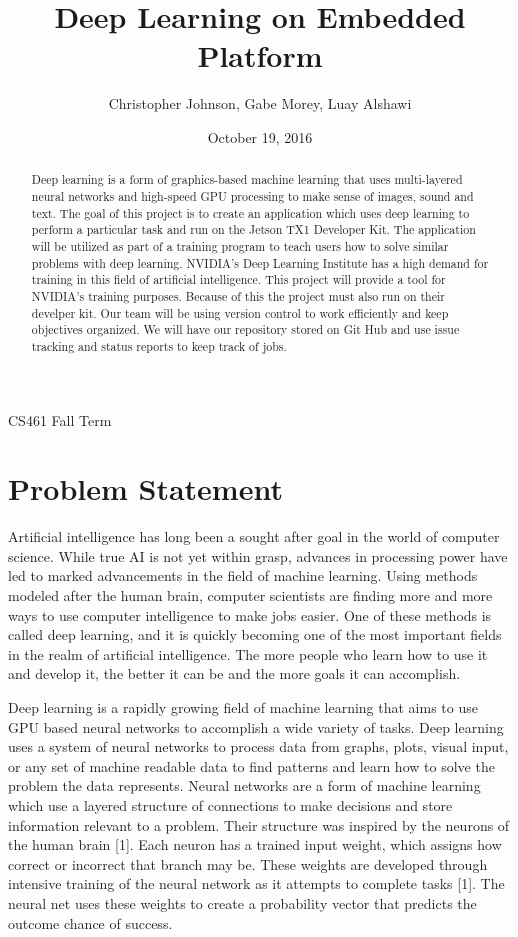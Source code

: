 \documentclass[letterpaper,10pt]{article}
\author{Christopher Johnson, Gabe Morey, Luay Alshawi}
\title{Deep Learning on Embedded Platform}
\date{October 19, 2016}
\begin{document}
\begin{titlingpage}
\maketitle
CS461 Fall Term
\begin{abstract}
Deep learning is a form of graphics-based machine learning that uses multi-layered neural networks and high-speed GPU processing to make sense of images, sound and text. The goal of this project is to create an application which uses deep learning to perform a particular task and run on the Jetson TX1 Developer Kit. The application will be utilized as part of a training program to teach users how to solve similar problems with deep learning. NVIDIA's Deep Learning Institute has a high demand for training in this field of artificial intelligence. This project will provide a tool for NVIDIA's training purposes. Because of this the project must also run on their develper kit. Our team will be using version control to work efficiently and keep objectives organized. We will have our repository stored on Git Hub and use issue tracking and status reports to keep track of jobs.
\end{abstract}
\end{titlingpage}

\section{Problem Statement}
Artificial intelligence has long been a sought after goal in the world of computer science. While true AI is not yet within grasp, advances in processing power have led to marked advancements in the field of machine learning. Using methods modeled after the human brain, computer scientists are finding more and more ways to use computer intelligence to make jobs easier. One of these methods is called deep learning, and it is quickly becoming one of the most important fields in the realm of artificial intelligence. The more people who learn how to use it and develop it, the better it can be and the more goals it can accomplish.

Deep learning is a rapidly growing field of machine learning that aims to use GPU based neural networks to accomplish a wide variety of tasks. Deep learning uses a system of neural networks to process data from graphs, plots, visual input, or any set of machine readable data to find patterns and learn how to solve the problem the data represents. Neural networks are a form of machine learning which use a layered structure of connections to make decisions and store information relevant to a problem. Their structure was inspired by the neurons of the human brain [1]. Each neuron has a trained input weight, which assigns how correct or incorrect that branch may be. These weights are developed through intensive training of the neural network as it attempts to complete tasks [1].  The neural net uses these weights to create a probability vector that predicts the outcome chance of success.
 
\end{document}
